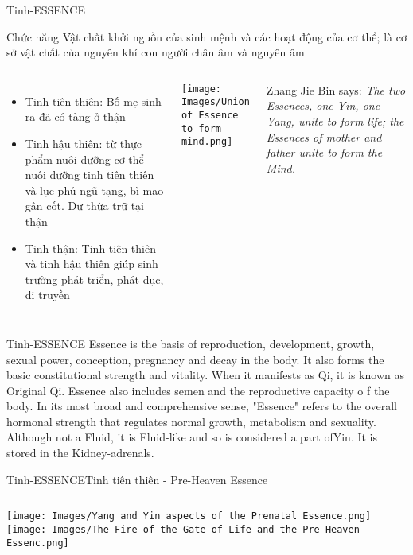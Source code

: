 \documentclass[
	11pt, %
]{beamer}
\theoremstyle{newblock}
\begin{document}
\begin{frame}{Tinh-ESSENCE}
\begin{block}{Chức năng}
	Vật chất khởi nguồn của sinh mệnh và các hoạt động của cơ thể; là cơ
sở vật chất của nguyên khí con người chân âm và nguyên âm
\end{block}
\begin{columns}[T]
	\begin{itemize}
		\item Tinh tiên thiên: Bố mẹ sinh ra đã có tàng ở thận 
		\item Tinh hậu thiên: từ thực phẩm nuôi dưỡng cơ thể nuôi dưỡng tinh tiên thiên và lục phủ ngũ tạng, bì mao gân cốt. Dư thừa trữ tại thận 
		\item Tinh thận: Tinh tiên thiên và tinh hậu thiên giúp sinh trường phát triển, phát dục, di truyền
	\end{itemize}
	\begin{center}
		\texttt{[image: Images/Union of Essence to form mind.png]}
	\end{center}
	Zhang Jie Bin says: {\it The two Essences, one Yin, one Yang, unite to form life; the Essences of mother and father unite to form the Mind.}
\end{columns}
\end{frame}

\begin{frame}{Tinh-ESSENCE}
	Essence is the basis of reproduction, development, growth, sexual power, conception, pregnancy and decay in the body. It also forms the basic constitutional strength and vitality. When it manifests as Qi, it is known as Original Qi. Essence also includes semen and the reproductive capacity o f the body. In its most broad and comprehensive sense, "Essence" refers to the overall hormonal strength that regulates normal growth, metabolism and sexuality. Although not a Fluid, it is Fluid-like and so is considered a part ofYin. It is stored in the Kidney-adrenals.
\end{frame}

\begin{frame}{Tinh-ESSENCE}{Tinh tiên thiên - Pre-Heaven Essence}
	\begin{columns}
		\texttt{[image: Images/Yang and Yin aspects of the Prenatal Essence.png]}
		\texttt{[image: Images/The Fire of the Gate of Life and the Pre-Heaven Essenc.png]}
	\end{columns}
\end{frame}
\end{document}
